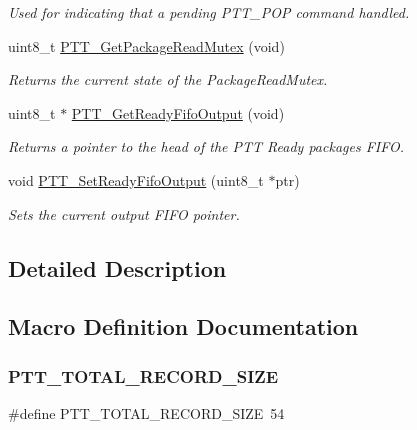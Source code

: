 \begin{DoxyCompactItemize}
\begin{DoxyCompactList}\small\item\em Used for indicating that a pending P\+T\+T\+\_\+\+P\+OP command handled. \end{DoxyCompactList}\item 
uint8\+\_\+t \hyperlink{group___p_t_t___service_gad597123d8ce8bd52a4eab91dbd5023f7}{P\+T\+T\+\_\+\+Get\+Package\+Read\+Mutex} (void)
\begin{DoxyCompactList}\small\item\em Returns the current state of the Package\+Read\+Mutex. \end{DoxyCompactList}\item 
uint8\+\_\+t $\ast$ \hyperlink{group___p_t_t___service_gad621e3cbcce8a429cbb830ccd3bcd95f}{P\+T\+T\+\_\+\+Get\+Ready\+Fifo\+Output} (void)
\begin{DoxyCompactList}\small\item\em Returns a pointer to the head of the P\+TT Ready packages F\+I\+FO. \end{DoxyCompactList}\item 
void \hyperlink{group___p_t_t___service_ga21b2bb3dfbb265ec298c3831be5ec743}{P\+T\+T\+\_\+\+Set\+Ready\+Fifo\+Output} (uint8\+\_\+t $\ast$ptr)
\begin{DoxyCompactList}\small\item\em Sets the current output F\+I\+FO pointer. \end{DoxyCompactList}\end{DoxyCompactItemize}


\subsection{Detailed Description}


\subsection{Macro Definition Documentation}
\mbox{\label{group___p_t_t___service_gab50c3b95c842350db5767685feb81aa7}} 
\subsubsection{\texorpdfstring{P\+T\+T\+\_\+\+T\+O\+T\+A\+L\+\_\+\+R\+E\+C\+O\+R\+D\+\_\+\+S\+I\+ZE}{PTT\_TOTAL\_RECORD\_SIZE}}
{\footnotesize\ttfamily \#define P\+T\+T\+\_\+\+T\+O\+T\+A\+L\+\_\+\+R\+E\+C\+O\+R\+D\+\_\+\+S\+I\+ZE~54}

